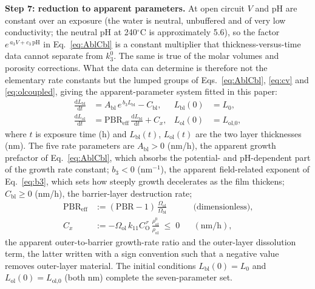 \documentclass[pdflatex,sn-nature]{sn-jnl}
\begin{document}
\textbf{Step 7: reduction to apparent parameters.} At open circuit $V$
and pH are constant over an exposure (the water is neutral, unbuffered
and of very low conductivity; the neutral pH at 240$^\circ$C is
approximately 5.6), so the factor $e^{\,a_3 V + c_3\,\mathrm{pH}}$ in
Eq.~\eqref{eq:AblCbl} is a constant multiplier that thickness-versus-time
data cannot separate from $k_3^0$. The same is true of the molar volumes
and porosity corrections. What the data can determine is therefore not
the elementary rate constants but the lumped groups of
Eqs.~\eqref{eq:AblCbl}, \eqref{eq:cv} and \eqref{eq:olcoupled}, giving
the apparent-parameter system fitted in this paper:
\begin{align}
\frac{\mathrm{d}L_\text{bl}}{\mathrm{d}t} &=
A_\text{bl}\, e^{\,b_3 L_\text{bl}} - C_\text{bl},
& L_\text{bl}(0) &= L_0,
\label{eq:odebl}\\
\frac{\mathrm{d}L_\text{ol}}{\mathrm{d}t} &=
\mathrm{PBR}_\text{eff}\,
\frac{\mathrm{d}L_\text{bl}}{\mathrm{d}t} + C_x,
& L_\text{ol}(0) &= L_\text{ol,0},
\label{eq:odeol}
\end{align}
where $t$ is exposure time (h) and $L_\text{bl}(t)$, $L_\text{ol}(t)$
are the two layer thicknesses (nm). The five rate parameters are
$A_\text{bl}>0$ (nm/h), the apparent growth prefactor of
Eq.~\eqref{eq:AblCbl}, which absorbs the potential- and pH-dependent
part of the growth rate constant; $b_3<0$ (nm$^{-1}$), the apparent
field-related exponent of Eq.~\eqref{eq:b3}, which sets how steeply
growth decelerates as the film thickens; $C_\text{bl}\ge0$
(nm/h), the barrier-layer destruction rate;
\begin{equation}
\begin{aligned}
\mathrm{PBR}_\text{eff} &:= (\mathrm{PBR}-1)\,
\frac{\Omega_\text{ol}}{\Omega_\text{bl}}
&&\text{(dimensionless)},\\[2pt]
C_x &:= -\Omega_\text{ol}\, k_{11} C_\mathrm{O}^{\,r}\,
\frac{\rho^0_\text{ol}}{\rho_\text{ol}} \;\le\; 0
&&(\mathrm{nm/h}),
\end{aligned}
\label{eq:pbreffCx}
\end{equation}
the apparent outer-to-barrier growth-rate ratio and the outer-layer
dissolution term, the latter written with a sign convention such that a
negative value removes outer-layer material. The initial conditions
$L_\text{bl}(0)=L_0$ and $L_\text{ol}(0)=L_\text{ol,0}$ (both nm)
complete the seven-parameter set.
\end{document}
